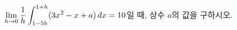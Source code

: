 $\displaystyle\lim_{h\to 0}\dfrac{1}{h}\displaystyle\int_{1-5h}^{1+h} (3x^2-x+a)\mkern3mu dx=10$일 때, 상수 $a$의 값을 구하시오.
